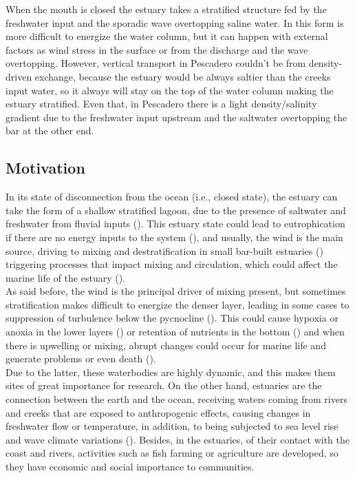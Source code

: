 \documentclass[11pt,letterpaper]{article}
\begin{document}
When the mouth is closed the estuary takes a stratified structure fed by the freshwater input and the sporadic wave overtopping saline water. In this form is more difficult to energize the water column, but it can happen with external factors as wind stress in the surface or from the discharge and the wave overtopping. However, vertical transport in Pescadero couldn't be from density-driven exchange, because the estuary would be always saltier than the creeks input water, so it always will stay on the top of the water column making the estuary stratified. Even that, in Pescadero there is a light density/salinity gradient due to the freshwater input upstream and the saltwater overtopping the bar at the other end.\\

\subsection{Motivation}

In its state of disconnection from the ocean (i.e., closed state), the estuary can take the form of a shallow stratified lagoon, due to the presence of saltwater and freshwater from fluvial inputs (\cite{Behrens2016}). This estuary state could lead to eutrophication if there are no energy inputs to the system (\cite{nunes2014responses}), and usually, the wind is the main source, driving to mixing and destratification in small bar-built estuaries (\cite{Gale2006}) triggering processes that impact mixing and circulation, which could affect the marine life of the estuary (\cite{marti2008relating}). \\

As said before, the wind is the principal driver of mixing present, but sometimes stratification makes difficult to energize the denser layer, leading in some cases to suppression of turbulence below the pycnocline (\cite{Cousins2010}). This could cause hypoxia or anoxia in the lower layers (\cite{Kelly2018}) or retention of nutrients in the bottom (\cite{Cousins2010}) and when there is upwelling or mixing, abrupt changes could occur for marine life and generate problems or even death (\cite{marti2008relating}).\\  

Due to the latter, these waterbodies are highly dynamic, and this makes them sites of great importance for research. On the other hand, estuaries are the connection between the earth and the ocean, receiving waters coming from rivers and creeks that are exposed to anthropogenic effects, causing changes in freshwater flow or temperature, in addition, to being subjected to sea level rise and wave climate variations (\cite{grez2020evidence, holt2010potential, thorne2021wetlands}). Besides, in the estuaries, of their contact with the coast and rivers, activities such as fish farming or agriculture are developed, so they have economic and social importance to communities. \\
\end{document}
